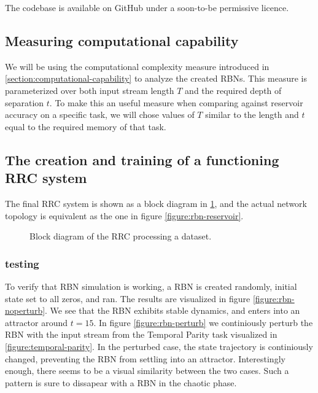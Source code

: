 The codebase is available on GitHub \cite{forprosjekt-code-github} under a soon-to-be permissive licence.

\subsection{Measuring computational capability}

We will be using the computational complexity measure introduced in \ref{section:computational-capability} to analyze the created RBNs.
This measure is parameterized over both input stream length $T$ and the required depth of separation $t$.
To make this an useful measure when comparing against reservoir accuracy on a specific task,
we will chose values of $T$ similar to the length and $t$ equal to the required memory of that task.

\subsection{The creation and training of a functioning RRC system}

The final RRC system is shown as a block diagram in \ref{figure:rrc-block},
and the actual network topology is equivalent as the one in figure \ref{figure:rbn-reservoir}.

\begin{figure}
  \centering
  \caption{Block diagram of the RRC processing a dataset.}
  \label{figure:rrc-block}
\end{figure}

\subsubsection{testing}

To verify that RBN simulation is working,
a RBN is created randomly, initial state set to all zeros, and ran.
The results are visualized in figure \ref{figure:rbn-noperturb}.
We see that the RBN exhibits stable dynamics, and enters into an attractor around $t=15$.
In figure \ref{figure:rbn-perturb} we continiously perturb the RBN with the input stream from the Temporal Parity task visualized in \ref{figure:temporal-parity}.
In the perturbed case, the state trajectory is continiously changed, preventing the RBN from settling into an attractor.
Interestingly enough, there seems to be a visual similarity between the two cases.
Such a pattern is sure to dissapear with a RBN in the chaotic phase.

